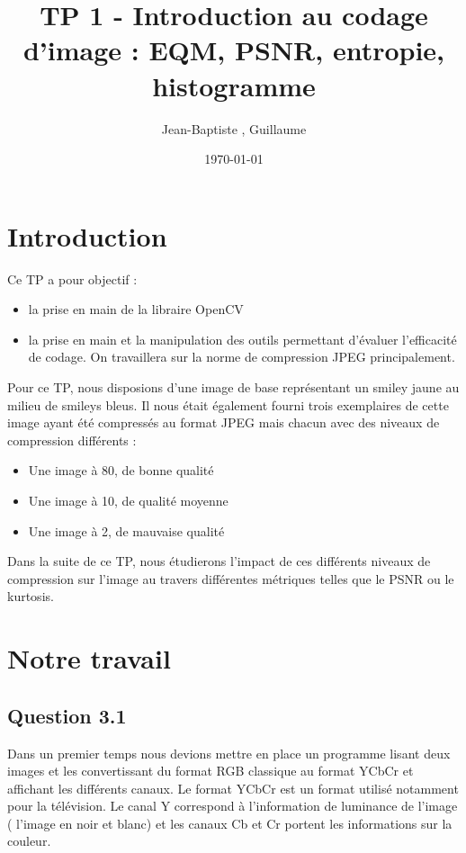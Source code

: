 \documentclass[12pt]{report}
\title{TP 1 - Introduction au codage d'image : EQM, PSNR, entropie, histogramme}
\author{Jean-Baptiste \bsc{Morice}, Guillaume \bsc{Versal}}
\date{\today}
\begin{document}
\maketitle

\tableofcontents

\newpage
\section*{Introduction}

Ce TP a pour objectif :
\begin{itemize}
\item la prise en main de la libraire OpenCV
\item la prise en main et la manipulation des outils permettant d'évaluer l'efficacité de codage. On travaillera sur la norme de compression JPEG principalement.\\
\end{itemize}
Pour ce TP, nous disposions d'une image de base représentant un smiley jaune au milieu de smileys bleus. Il nous était également fourni trois exemplaires de cette image ayant été compressés au format JPEG mais chacun avec des niveaux de compression différents : 
\begin{itemize}
\item Une image à 80, de bonne qualité
\item Une image à 10,  de qualité moyenne
\item Une image à 2, de mauvaise qualité\\
\end{itemize}
Dans la suite de ce TP, nous étudierons l'impact de ces différents niveaux de compression sur l'image au travers différentes métriques telles que le PSNR ou le kurtosis.


\newpage
\section{Notre travail}

\subsection{Question 3.1}

Dans un premier temps nous devions mettre en place un programme lisant deux images et les convertissant du format RGB classique au format YCbCr et affichant les différents canaux. Le format YCbCr est un format utilisé notamment pour la télévision. Le canal Y correspond à l'information de luminance de l'image ( l'image en noir et blanc) et les canaux Cb et Cr portent les informations sur la couleur. 
\end{document}
